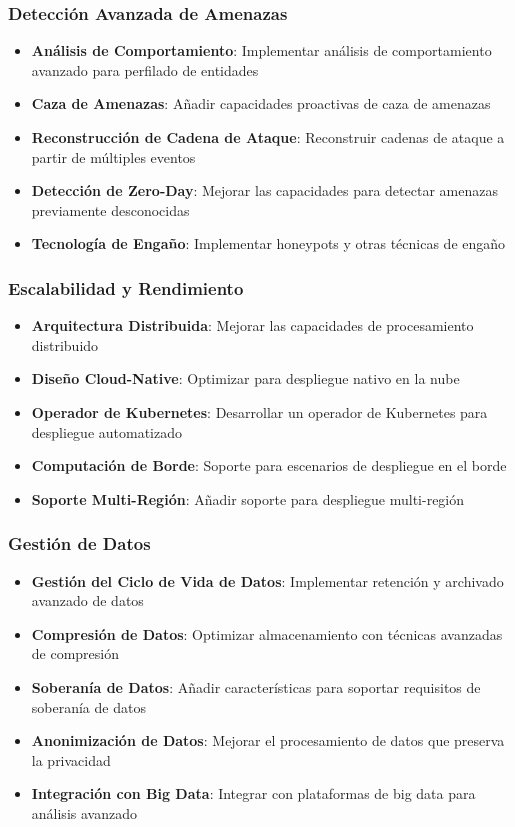 \subsubsection{Detección Avanzada de Amenazas}
\begin{itemize}
    \item \textbf{Análisis de Comportamiento}: Implementar análisis de comportamiento avanzado para perfilado de entidades
    \item \textbf{Caza de Amenazas}: Añadir capacidades proactivas de caza de amenazas
    \item \textbf{Reconstrucción de Cadena de Ataque}: Reconstruir cadenas de ataque a partir de múltiples eventos
    \item \textbf{Detección de Zero-Day}: Mejorar las capacidades para detectar amenazas previamente desconocidas
    \item \textbf{Tecnología de Engaño}: Implementar honeypots y otras técnicas de engaño
\end{itemize}

\subsubsection{Escalabilidad y Rendimiento}
\begin{itemize}
    \item \textbf{Arquitectura Distribuida}: Mejorar las capacidades de procesamiento distribuido
    \item \textbf{Diseño Cloud-Native}: Optimizar para despliegue nativo en la nube
    \item \textbf{Operador de Kubernetes}: Desarrollar un operador de Kubernetes para despliegue automatizado
    \item \textbf{Computación de Borde}: Soporte para escenarios de despliegue en el borde
    \item \textbf{Soporte Multi-Región}: Añadir soporte para despliegue multi-región
\end{itemize}

\subsubsection{Gestión de Datos}
\begin{itemize}
    \item \textbf{Gestión del Ciclo de Vida de Datos}: Implementar retención y archivado avanzado de datos
    \item \textbf{Compresión de Datos}: Optimizar almacenamiento con técnicas avanzadas de compresión
    \item \textbf{Soberanía de Datos}: Añadir características para soportar requisitos de soberanía de datos
    \item \textbf{Anonimización de Datos}: Mejorar el procesamiento de datos que preserva la privacidad
    \item \textbf{Integración con Big Data}: Integrar con plataformas de big data para análisis avanzado
\end{itemize}

